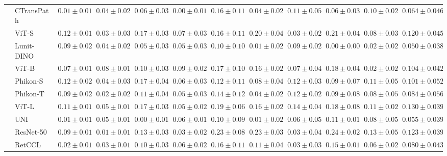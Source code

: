 \begin{tabular}{ll|cccc|c|cccc|c}
 & CTransPath~\cite{wang2022transformer} & $0.01 \pm 0.01$ & $0.04 \pm 0.02$ & $0.06 \pm 0.03$ & $\mathbf{0.00 \pm 0.01}$ & $0.16 \pm 0.11$ & $0.04 \pm 0.02$ & $0.11 \pm 0.05$ & $0.06 \pm 0.03$ & $0.10 \pm 0.02$ & $0.064 \pm 0.046$ \\
 & ViT-S~\cite{kolesnikov2021image} & $0.12 \pm 0.01$ & $0.03 \pm 0.03$ & $0.17 \pm 0.03$ & $0.07 \pm 0.03$ & $0.16 \pm 0.11$ & $0.20 \pm 0.04$ & $0.03 \pm 0.02$ & $0.21 \pm 0.04$ & $0.08 \pm 0.03$ & $0.120 \pm 0.045$ \\
 & Lunit-DINO~\cite{kang2023benchmarking} & $0.09 \pm 0.02$ & $0.04 \pm 0.02$ & $0.05 \pm 0.03$ & $0.05 \pm 0.03$ & $0.10 \pm 0.10$ & $0.01 \pm 0.02$ & $0.09 \pm 0.02$ & $\mathbf{0.00 \pm 0.00}$ & $\mathbf{0.02 \pm 0.02}$ & $\mathbf{0.050 \pm 0.038}$ \\
 & ViT-B~\cite{kolesnikov2021image} & $0.07 \pm 0.01$ & $0.08 \pm 0.01$ & $0.10 \pm 0.03$ & $0.09 \pm 0.02$ & $0.17 \pm 0.10$ & $0.16 \pm 0.02$ & $0.07 \pm 0.04$ & $0.18 \pm 0.04$ & $0.02 \pm 0.02$ & $0.104 \pm 0.042$ \\
 & Phikon-S~\cite{filiot2023scaling} & $0.12 \pm 0.02$ & $0.04 \pm 0.03$ & $0.17 \pm 0.04$ & $0.06 \pm 0.03$ & $0.12 \pm 0.11$ & $0.08 \pm 0.04$ & $0.12 \pm 0.03$ & $0.09 \pm 0.07$ & $0.11 \pm 0.05$ & $0.101 \pm 0.052$ \\
 & Phikon-T~\cite{filiot2023scaling} & $0.09 \pm 0.02$ & $0.02 \pm 0.02$ & $0.11 \pm 0.04$ & $0.05 \pm 0.03$ & $0.14 \pm 0.12$ & $0.04 \pm 0.02$ & $0.12 \pm 0.02$ & $0.09 \pm 0.08$ & $0.08 \pm 0.05$ & $0.084 \pm 0.056$ \\
 & ViT-L~\cite{kolesnikov2021image} & $0.11 \pm 0.01$ & $0.05 \pm 0.01$ & $0.17 \pm 0.03$ & $0.05 \pm 0.02$ & $0.19 \pm 0.06$ & $0.16 \pm 0.02$ & $0.14 \pm 0.04$ & $0.18 \pm 0.08$ & $0.11 \pm 0.02$ & $0.130 \pm 0.039$ \\
 & UNI~\cite{chen2024uni} & $\mathbf{0.01 \pm 0.01}$ & $0.05 \pm 0.01$ & $\mathbf{0.00 \pm 0.01}$ & $0.06 \pm 0.01$ & $\mathbf{0.10 \pm 0.09}$ & $\mathbf{0.01 \pm 0.02}$ & $0.06 \pm 0.05$ & $0.11 \pm 0.01$ & $0.08 \pm 0.05$ & $0.055 \pm 0.039$ \\
 & ResNet-50~\cite{he2015deep} & $0.09 \pm 0.01$ & $\mathbf{0.01 \pm 0.01}$ & $0.13 \pm 0.03$ & $0.03 \pm 0.02$ & $0.23 \pm 0.08$ & $0.23 \pm 0.03$ & $0.03 \pm 0.04$ & $0.24 \pm 0.02$ & $0.13 \pm 0.05$ & $0.123 \pm 0.039$ \\
 & RetCCL~\cite{wang2023retccl} & $0.02 \pm 0.01$ & $0.03 \pm 0.01$ & $0.10 \pm 0.03$ & $0.06 \pm 0.02$ & $0.16 \pm 0.11$ & $0.11 \pm 0.04$ & $0.03 \pm 0.03$ & $0.15 \pm 0.01$ & $0.06 \pm 0.02$ & $0.080 \pm 0.043$ \\

\end{tabular}
